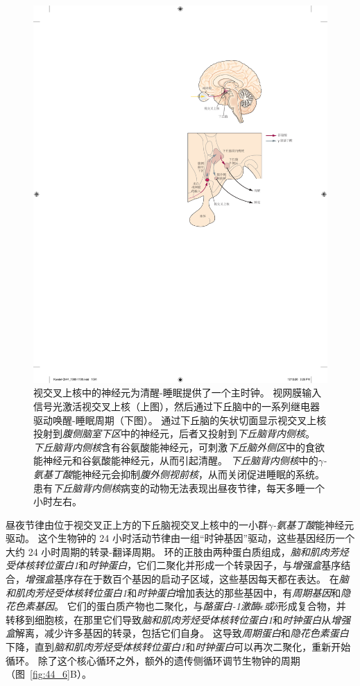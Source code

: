 \begin{figure}[htbp]
	\centering
	\includegraphics[width=0.65\linewidth]{chap44/fig_44_7}
	\caption{视交叉上核中的神经元为清醒-睡眠提供了一个主时钟。
		视网膜输入信号光激活视交叉上核（上图），然后通过下丘脑中的一系列继电器驱动唤醒-睡眠周期（下图）。
		通过下丘脑的矢状切面显示视交叉上核投射到\textit{腹侧脑室下区}中的神经元，后者又投射到\textit{下丘脑背内侧核}。
		\textit{下丘脑背内侧核}含有谷氨酸能神经元，可刺激\textit{下丘脑外侧区}中的食欲能神经元和谷氨酸能神经元，从而引起清醒。
		\textit{下丘脑背内侧核}中的\textit{$\gamma$-氨基丁酸}能神经元会抑制\textit{腹外侧视前核}，从而关闭促进睡眠的系统。
		患有\textit{下丘脑背内侧核}病变的动物无法表现出昼夜节律，每天多睡一个小时左右。}
	\label{fig:44_7}
\end{figure}


昼夜节律由位于视交叉正上方的下丘脑视交叉上核中的一小群\textit{$\gamma$-氨基丁酸}能神经元驱动。
这个生物钟的 24 小时活动节律由一组“时钟基因”驱动，这些基因经历一个大约 24 小时周期的转录-翻译周期。
环的正肢由两种蛋白质组成，\textit{脑和肌肉芳烃受体核转位蛋白1}和\textit{时钟蛋白}，它们二聚化并形成一个转录因子，与\textit{增强盒}基序结合，\textit{增强盒}基序存在于数百个基因的启动子区域，这些基因每天都在表达。
在\textit{脑和肌肉芳烃受体核转位蛋白1}和\textit{时钟蛋白}增加表达的那些基因中，有\textit{周期基因}和\textit{隐花色素基因}。
它们的蛋白质产物也二聚化，与\textit{酪蛋白-1激酶$\epsilon$或$\delta$}形成复合物，并转移到细胞核，在那里它们导致\textit{脑和肌肉芳烃受体核转位蛋白1}和\textit{时钟蛋白}从\textit{增强盒}解离，减少许多基因的转录，包括它们自身。
这导致\textit{周期蛋白}和\textit{隐花色素蛋白}下降，直到\textit{脑和肌肉芳烃受体核转位蛋白1}和\textit{时钟蛋白}可以再次二聚化，重新开始循环。
除了这个核心循环之外，额外的遗传侧循环调节生物钟的周期（图~\ref{fig:44_6}B）。


